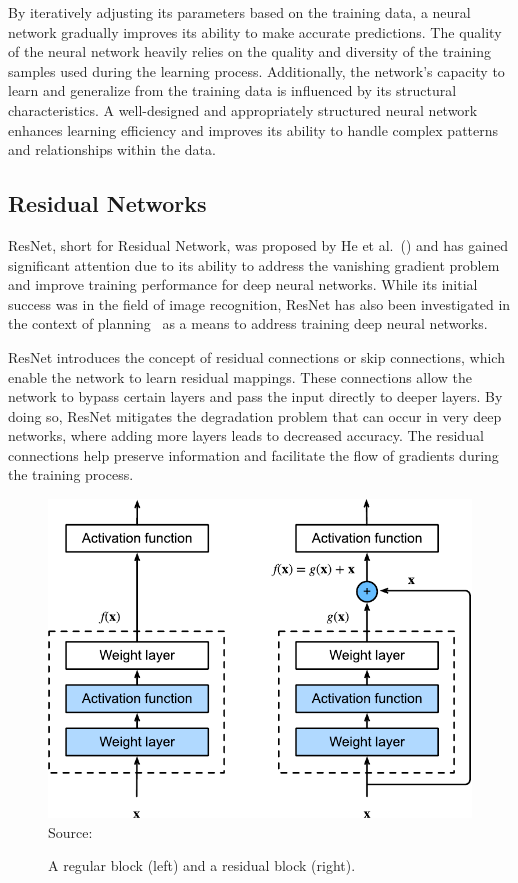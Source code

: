 By iteratively adjusting its parameters based on the training data, a neural network gradually improves its ability to make accurate predictions. The quality of the neural network heavily relies on the quality and diversity of the training samples used during the learning process. Additionally, the network's capacity to learn and generalize from the training data is influenced by its structural characteristics. A well-designed and appropriately structured neural network enhances learning efficiency and improves its ability to handle complex patterns and relationships within the data.

\subsection{Residual Networks}
\label{sec:background_resnets}

ResNet, short for Residual Network, was proposed by He et al.~(\citeyear{He.etal/2016}) and has gained significant attention due to its ability to address the vanishing gradient problem~\cite{Hochreiter/1998} and improve training performance for deep neural networks. While its initial success was in the field of image recognition, ResNet has also been investigated in the context of planning~\cite{Agostinelli.etal/2019,Ferber.etal/2022} as a means to address training deep neural networks.

ResNet introduces the concept of residual connections or skip connections, which enable the network to learn residual mappings. These connections allow the network to bypass certain layers and pass the input directly to deeper layers. By doing so, ResNet mitigates the degradation problem that can occur in very deep networks, where adding more layers leads to decreased accuracy. The residual connections help preserve information and facilitate the flow of gradients during the training process.

\begin{figure}[ht]
    \caption[A regular block and a residual block.]{A regular block (left) and a residual block (right).}
    \label{fig:residual_block}
    \addvspace{\baselineskip}
    \centering
    \includegraphics[width=0.75\linewidth]{figures/residual_block.pdf} \\
    Source:~\cite{Zhang.etal/2021}
\end{figure}

